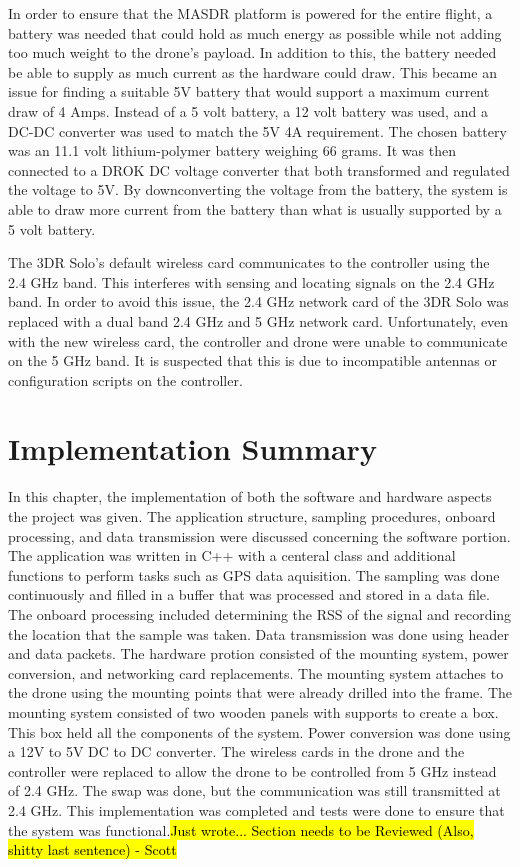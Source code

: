 In order to ensure that the MASDR platform is powered for the entire flight, a battery was needed that could hold as much energy as possible while not adding too much weight to the drone’s payload. In addition to this, the battery needed be able to supply as much current as the hardware could draw. This became an issue for finding a suitable 5V battery that would support a maximum current draw of 4 Amps. Instead of a 5 volt battery, a 12 volt battery was used, and a DC-DC converter was used to match the 5V 4A requirement. The chosen battery was an 11.1 volt lithium-polymer battery weighing 66 grams. It was then connected to a DROK DC voltage converter that both transformed and regulated the voltage to 5V. By downconverting the voltage from the battery, the system is able to draw more current from the battery than what is usually supported by a 5 volt battery. \par
The 3DR Solo’s default wireless card communicates to the controller using the 2.4 GHz band. This interferes with sensing and locating signals on the 2.4 GHz band. In order to avoid this issue, the 2.4 GHz network card of the 3DR Solo was replaced with a dual band 2.4 GHz and 5 GHz network card. Unfortunately, even with the new wireless card, the controller and drone were unable to communicate on the 5 GHz band. It is suspected that this is due to incompatible antennas or configuration scripts on the controller.

\section{Implementation Summary}
In this chapter, the implementation of both the software and hardware aspects the project was given. The application structure, sampling procedures, onboard processing, and data transmission were discussed concerning the software portion. The application was written in C++ with a centeral class and additional functions to perform tasks such as GPS data aquisition. The sampling was done continuously and filled in a buffer that was processed and stored in a data file. The onboard processing included determining the RSS of the signal and recording the location that the sample was taken. Data transmission was done using header and data packets. The hardware protion consisted of the mounting system, power conversion, and networking card replacements. The mounting system attaches to the drone using the mounting points that were already drilled into the frame. The mounting system consisted of two wooden panels with supports to create a box. This box held all the components of the system. Power conversion was done using a 12V to 5V DC to DC converter. The wireless cards in the drone and the controller were replaced to allow the drone to be controlled from 5 GHz instead of 2.4 GHz. The swap was done, but the communication was still transmitted at 2.4 GHz. This implementation was completed and tests were done to ensure that the system was functional.\hl{Just wrote... Section needs to be Reviewed (Also, shitty last sentence) - Scott}

